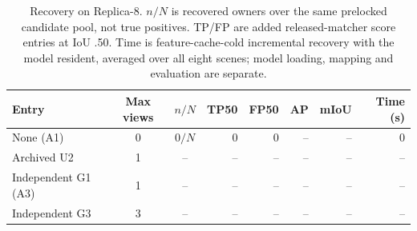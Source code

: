 \begin{table}[!ht]
\centering
\caption{Recovery on Replica-8. $n/N$ is recovered owners over the same prelocked candidate pool, not true positives. TP/FP are added released-matcher score entries at IoU .50. Time is feature-cache-cold incremental recovery with the model resident, averaged over all eight scenes; model loading, mapping and evaluation are separate.}
\label{tab:recovery}
\fontsize{9}{10.5}\selectfont
\setlength{\tabcolsep}{4pt}
\begin{tabular*}{\textwidth}{@{\extracolsep{\fill}}lccrrrrr@{}}
\toprule
Entry & Max views & $n/N$ & TP50 & FP50 & AP & mIoU & Time (s) \\
\midrule
None (A1) & 0 & $0/N$ & 0 & 0 & -- & -- & 0 \\
Archived U2 & 1 & -- & -- & -- & -- & -- & -- \\
Independent G1 (A3) & 1 & -- & -- & -- & -- & -- & -- \\
Independent G3 & 3 & -- & -- & -- & -- & -- & -- \\
\bottomrule
\end{tabular*}
\end{table}
